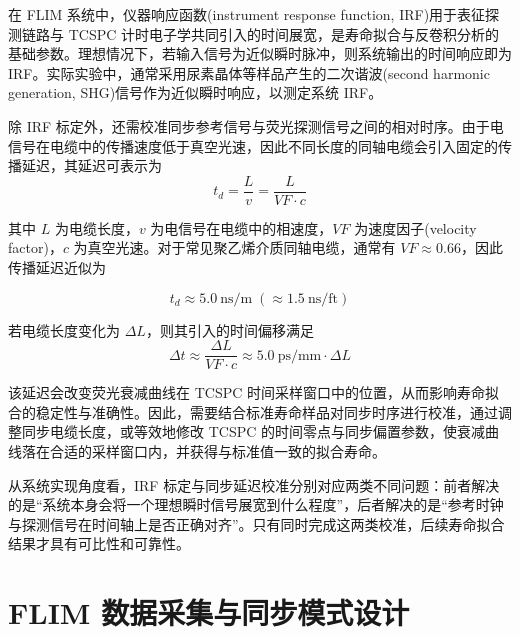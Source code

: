 在 FLIM 系统中，仪器响应函数(instrument response function, IRF)用于表征探测链路与 TCSPC 计时电子学共同引入的时间展宽，是寿命拟合与反卷积分析的基础参数。理想情况下，若输入信号为近似瞬时脉冲，则系统输出的时间响应即为 IRF。实际实验中，通常采用尿素晶体等样品产生的二次谐波(second harmonic generation, SHG)信号作为近似瞬时响应，以测定系统 IRF。

除 IRF 标定外，还需校准同步参考信号与荧光探测信号之间的相对时序\cite{RN94}。由于电信号在电缆中的传播速度低于真空光速，因此不同长度的同轴电缆会引入固定的传播延迟，其延迟可表示为
\begin{equation}
  t_d=\frac{L}{v}=\frac{L}{VF\cdot c}
\end{equation}

其中 $L$ 为电缆长度，$v$ 为电信号在电缆中的相速度，$VF$ 为速度因子(velocity factor)，$c$ 为真空光速。对于常见聚乙烯介质同轴电缆，通常有 $VF\approx 0.66$，因此传播延迟近似为

\begin{equation}
  t_d \approx 5.0~\text{ns/m}\;(\approx 1.5~\text{ns/ft})
\end{equation}

若电缆长度变化为 $\Delta L$，则其引入的时间偏移满足
\begin{equation}
  \Delta t \approx \frac{\Delta L}{VF\cdot c}\approx 5.0~\text{ps/mm}\cdot \Delta L
\end{equation}

该延迟会改变荧光衰减曲线在 TCSPC 时间采样窗口中的位置，从而影响寿命拟合的稳定性与准确性。因此，需要结合标准寿命样品对同步时序进行校准，通过调整同步电缆长度，或等效地修改 TCSPC 的时间零点与同步偏置参数，使衰减曲线落在合适的采样窗口内，并获得与标准值一致的拟合寿命。

从系统实现角度看，IRF 标定与同步延迟校准分别对应两类不同问题：前者解决的是``系统本身会将一个理想瞬时信号展宽到什么程度''，后者解决的是``参考时钟与探测信号在时间轴上是否正确对齐''。只有同时完成这两类校准，后续寿命拟合结果才具有可比性和可靠性。





\section{FLIM 数据采集与同步模式设计}\label{5.3}

